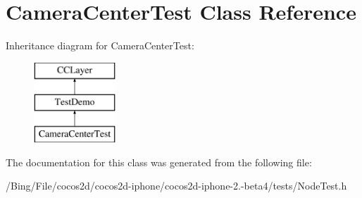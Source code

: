 \hypertarget{interface_camera_center_test}{\section{Camera\-Center\-Test Class Reference}
\label{interface_camera_center_test}
}
Inheritance diagram for Camera\-Center\-Test\-:\begin{figure}[H]
\begin{center}
\leavevmode
\includegraphics[height=3.000000cm]{interface_camera_center_test}
\end{center}
\end{figure}


The documentation for this class was generated from the following file\-:\begin{DoxyCompactItemize}
\item 
/\-Bing/\-File/cocos2d/cocos2d-\/iphone/cocos2d-\/iphone-\/2.-\/beta4/tests/Node\-Test.\-h\end{DoxyCompactItemize}
